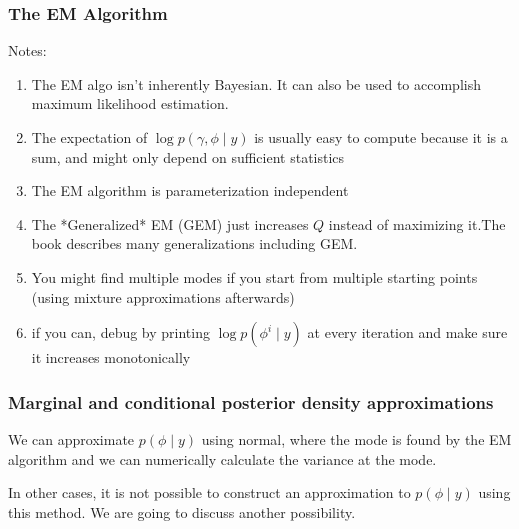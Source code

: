 \documentclass{beamer}
\begin{document}
\begin{frame}
\frametitle{The EM Algorithm}

Notes:
\begin{enumerate}
\item The EM algo isn't inherently Bayesian. It can also be used to accomplish maximum likelihood estimation.
\item The expectation of $\log p(\gamma, \phi \mid y)$ is usually easy to compute because it is a sum, and might only depend on sufficient statistics
\item The EM algorithm is parameterization independent
\item The *Generalized* EM (GEM) just increases $Q$ instead of
  maximizing it.The book describes many generalizations including GEM.
\item You might find multiple modes if you start from multiple starting points (using mixture approximations afterwards)
\item if you can, debug by printing $\log p(\phi^i \mid y)$ at every iteration and make sure it increases monotonically
\end{enumerate}

\end{frame}

\begin{frame}
  \frametitle{Marginal and conditional posterior density
    approximations}
  We can approximate $p(\phi \mid y)$ using normal, where the mode is
  found by the EM algorithm and we can numerically calculate the
  variance at the mode. 

  In other cases, it is not possible to construct an approximation to
  $p(\phi \mid y)$ using this method. We are going to discuss another possibility.
 
\end{frame}
\end{document}
